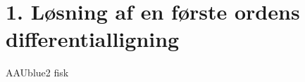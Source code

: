 \section*{1. Løsning af en første ordens differentialligning}
% 
%
\begin{color}{AAUblue2}
%
fisk
% 
\end{color}
\\\\
% 
%
